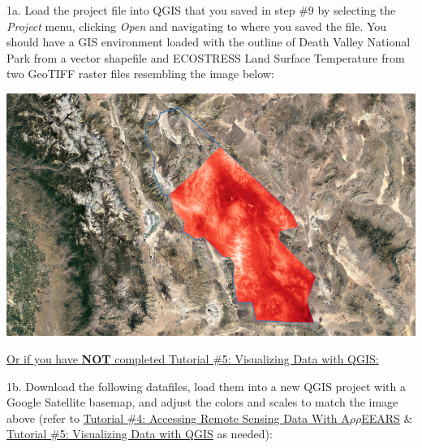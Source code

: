 \documentclass[oneside,a4paper,11pt,explicit]{book}
\begin{document}
\vspace{.5em}

1a. Load the project file into QGIS that you saved in step \#9 by selecting the \textit{Project} menu, clicking \textit{Open} and navigating to where you saved the file. You should have a GIS environment loaded with the outline of Death Valley National Park from a vector shapefile and ECOSTRESS Land Surface Temperature from two GeoTIFF raster files resembling the image below:

\vspace{.5em}

\centerline{\includegraphics[width=\textwidth]{TempMap1.jpg}}

\vspace{.5em}

\underline{Or if you have \textbf{NOT} completed \href{https://jeremydforsythe.github.io/icecream-tutorials/Tutorial5_VisualizingDataWithQGIS/Tutorial5_VisualizingDataWithQGIS.pdf}{Tutorial \#5: Visualizing Data with QGIS}:}

\vspace{.5em} 

1b. Download the following datafiles, load them into a new QGIS project with a Google Satellite basemap, and adjust the colors and scales to match the image above (refer to \href{https://jeremydforsythe.github.io/icecream-tutorials/Tutorial4_AccessingRemoteSensingDataWithAppears/Tutorial4_AccessingRemoteSensingDataWithAppears.pdf}{Tutorial \#4: Accessing Remote Sensing Data With A$\rho\rho$EEARS} \& \href{https://jeremydforsythe.github.io/icecream-tutorials/Tutorial5_VisualizingDataWithQGIS/Tutorial5_VisualizingDataWithQGIS.pdf}{Tutorial \#5: Visualizing Data with QGIS} as needed):
\end{document}
